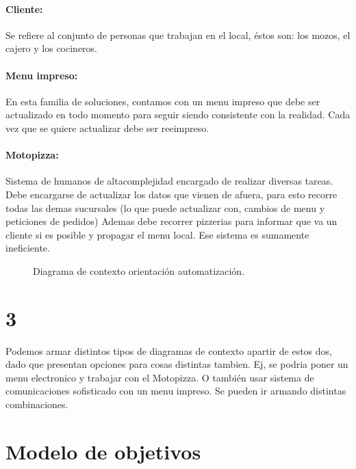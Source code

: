 \documentclass[a4paper,10pt]{article}
\begin{document}
\paragraph{Cliente:}
Se refiere al conjunto de personas que trabajan en el local, éstos son: los mozos, el cajero y los cocineros.
\\
\paragraph{Menu impreso:}
En esta familia de soluciones, contamos con un menu impreso que debe ser actualizado en todo momento para seguir siendo consistente con la realidad. Cada vez que se quiere actualizar debe ser reeimpreso.
\\
\paragraph{Motopizza:}
Sistema de humanos de altacomplejidad encargado de realizar diversas tareas. Debe encargarse de actualizar los datos que vienen de afuera, para esto recorre todas las demas sucursales (lo que puede actualizar con, cambios de menu y peticiones de pedidos) Ademas debe recorrer pizzerias para informar que va un cliente si es posible y propagar el menu local. Ese sistema es sumamente ineficiente.

\begin{figure}[H]
\centering
{}
\caption{Diagrama de contexto orientación automatización.}
\end{figure}

\section*{3} Podemos armar distintos tipos de diagramas de contexto apartir de estos dos, dado que presentan opciones para cosas distintas tambien. Ej, se podria poner un menu electronico y trabajar con el Motopizza. O también usar sistema de comunicaciones sofisticado con un menu impreso. Se pueden ir armando distintas combinaciones.


\section*{Modelo de objetivos}

\end{document}
